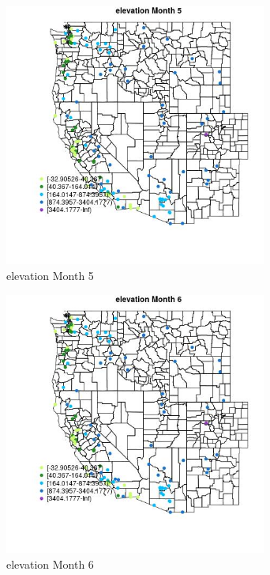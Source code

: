 \begin{figure} 
\centering  
\includegraphics[width=0.77\textwidth]{Code_Outputs/Report_ML_input_PM25_Step4_part_e_de_duplicated_aves_MapObsMo5elevation.jpg} 
\caption{\label{fig:Report_ML_input_PM25_Step4_part_e_de_duplicated_avesMapObsMo5elevation}elevation Month 5} 
\end{figure} 
 

\begin{figure} 
\centering  
\includegraphics[width=0.77\textwidth]{Code_Outputs/Report_ML_input_PM25_Step4_part_e_de_duplicated_aves_MapObsMo6elevation.jpg} 
\caption{\label{fig:Report_ML_input_PM25_Step4_part_e_de_duplicated_avesMapObsMo6elevation}elevation Month 6} 
\end{figure} 
 


